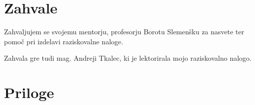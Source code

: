 \documentclass[11pt]{article}
\begin{document}
\begin{flushleft}


\end{flushleft}
\newpage
\section{Zahvale}
Zahvaljujem se svojemu mentorju, profesorju Borotu Slemenšku za nasvete ter pomoč pri izdelavi raziskovalne naloge.

Zahvala gre tudi mag. Andreji Tkalec, ki je lektorirala mojo raziskovalno nalogo.
\newpage
\section{Priloge}
\end{document}
